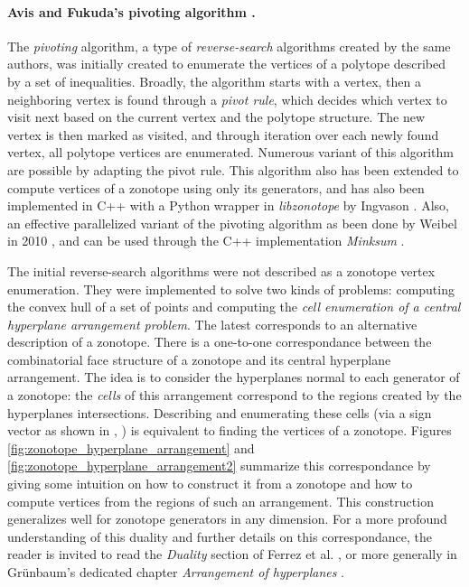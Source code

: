 \paragraph*{Avis and Fukuda's pivoting algorithm \cite{avisPivotingAlgorithmConvex}.}
The \emph{pivoting} algorithm, a type of \emph{reverse-search} algorithms created by the same authors, was initially created to enumerate the vertices of a polytope described by a set of inequalities. Broadly, the algorithm starts with a vertex, then a neighboring vertex is found through a \emph{pivot rule}, which decides which vertex to visit next based on the current vertex and the polytope structure. The new vertex is then marked as visited, and through iteration over each newly found vertex, all polytope vertices are enumerated. Numerous variant of this algorithm are possible by adapting the pivot rule. This algorithm also has been extended to compute vertices of a zonotope using only its generators, and has also been implemented in C++ with a Python wrapper in \emph{libzonotope} by Ingvason \cite{yngvassonLibzonotope}. Also, an effective parallelized variant of the pivoting algorithm as been done by Weibel in 2010 \cite{weibelImplementationParallelizationReverseSearch2010}, and can be used through the C++ implementation \emph{Minksum} \cite{weibelMinksum}.

The initial reverse-search algorithms were not described as a zonotope vertex enumeration. 
They were implemented to solve two kinds of problems: computing the convex hull of a set of points and computing the \emph{cell enumeration of a central hyperplane arrangement problem}. 
The latest corresponds to an alternative description of a zonotope. There is a one-to-one correspondance between the combinatorial face structure of a zonotope and its central hyperplane arrangement. The idea is to consider the hyperplanes normal to each generator of a zonotope: the \emph{cells} of this arrangement correspond to the regions created by the hyperplanes intersections. Describing and enumerating these cells (via a sign vector as shown in \cite{ferrezSolvingFixedRank2005a}, \cite{radaNewAlgorithmEnumeration2018}) is equivalent to finding the vertices of a zonotope. Figures \ref{fig:zonotope_hyperplane_arrangement} and \ref{fig:zonotope_hyperplane_arrangement2} summarize this correspondance by giving some intuition on how to construct it from a zonotope and how to compute vertices from the regions of such an arrangement. This construction generalizes well for zonotope generators in any dimension. 
For a more profound understanding of this duality and further details on this correspondance, the reader is invited to read the \emph{Duality} section of Ferrez et al. \cite{ferrezSolvingFixedRank2005a}, or more generally in Grünbaum's dedicated chapter \emph{Arrangement of hyperplanes} \cite{grunbaumConvexPolytopes2013}.

